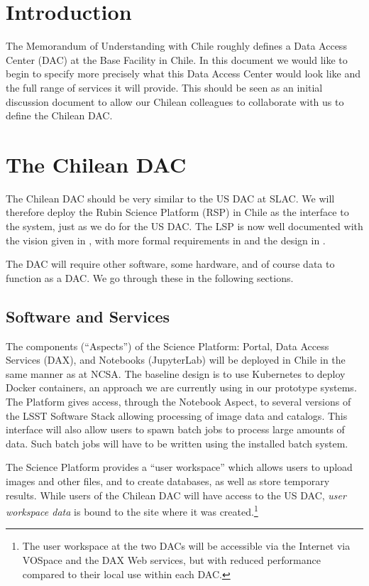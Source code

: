 \section{Introduction}

The Memorandum of Understanding with Chile  roughly defines a Data Access Center (DAC) at the Base Facility in Chile.
In this document we would like to begin to specify more precisely what this Data Access Center would look like and the full range of services it will provide.
This should be seen as an initial discussion document to allow our Chilean colleagues to collaborate with us to define the Chilean DAC.

\section{The Chilean DAC}

The Chilean DAC should be very similar to the US DAC at SLAC.
We will therefore deploy the Rubin  Science Platform (RSP) in Chile as the interface to the system,
just as we do for the US DAC.
The LSP is now well documented with the vision given in , with more formal requirements in  and the design in .

The DAC will require other software, some  hardware, and of course data to function as a DAC.
We go through these in the following sections.


\subsection{Software and Services}

The components (``Aspects'') of the Science Platform: Portal, Data Access Services (DAX), and Notebooks (JupyterLab) will be deployed in Chile in the same manner as at NCSA.
The baseline design is to use Kubernetes to deploy Docker containers, an approach we are currently using in our prototype systems.
The Platform gives access, through the Notebook Aspect, to several versions of the LSST Software Stack allowing processing of image data and catalogs.
This interface will also allow users to spawn batch jobs to process large amounts of data.
Such batch jobs will have to be written using the installed batch system.

The Science Platform provides a ``user workspace'' which allows users to upload images and other files, and to create databases, as well as store temporary results.
While users of the Chilean DAC will have access to the US DAC, \emph{user workspace data} is bound to the site where it was created.\footnote{The user workspace at the two DACs will be accessible via the Internet via VOSpace and the DAX Web services, but with reduced performance compared to their local use within each DAC.}

